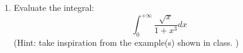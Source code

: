 \documentclass[fleqn]{article}
\begin{document}
\begin{enumerate}
\begin{enumerate}
{          When $R \to \infty$, then we have: \\
          \\
          \\
          $
            \bigints\limits_{0}^{+\infty} \dfrac{x^2}{1+x^4} dx=\dfrac{1}{2} \bigints\limits_{-\infty}^{+\infty} \dfrac{x^2}{1+x^4} dx
            \\
            \\
            \\
            \therefore ~~~~ \bigints\limits_{0}^{+\infty} \dfrac{x^2}{1+x^4} dx=\pi \dfrac{\sqrt{2}}{4}
            \\
            \\
          $
        }

    \end{enumerate}
    \item Evaluate the integral:
    $$\int^{+\infty}_{0} \frac{ \sqrt{x}}{1+x^3}dx$$
    (Hint: take inspiration from the example(s) shown in class. ) 


\end{enumerate}
\end{document}
